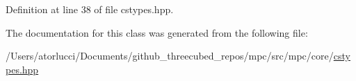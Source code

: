 Definition at line 38 of file cstypes.\+hpp.



The documentation for this class was generated from the following file\+:\begin{DoxyCompactItemize}
\item 
/\+Users/atorlucci/\+Documents/github\+\_\+threecubed\+\_\+repos/mpc/src/mpc/core/\mbox{\hyperlink{cstypes_8hpp}{cstypes.\+hpp}}\end{DoxyCompactItemize}

